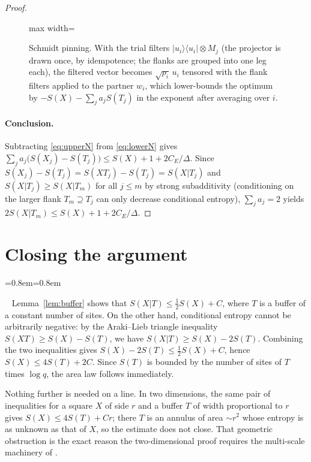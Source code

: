 \documentclass[aps,prx,reprint,superscriptaddress,floatfix,nofootinbib,longbibliography,amsmath,amssymb]{revtex4-2}
\theoremstyle{plain}
\theoremstyle{definition}
\newenvironment{inwords}{%
  \par\medskip\noindent
  \begin{list}{}{\leftmargin=0.8em\rightmargin=0.8em}
  \item\relax
  \noindent{\sffamily\bfseries\color{blue!40!black}In words.}\ \sffamily\small}{%
  \end{list}\par\medskip}
\begin{document}
\begin{proof}
\begin{figure}[t]
\centering
\begin{adjustbox}{max width=\linewidth}

\end{adjustbox}
\caption{Schmidt pinning. With the trial filters $|u_i\rangle\langle u_i|\otimes M_j$ (the projector is drawn once, by idempotence; the flanks are grouped into one leg each), the filtered vector becomes $\sqrt{p_i}\,u_i$ tensored with the flank filters applied to the partner $w_i$, which lower-bounds the optimum by $-S(X)-\sum_ja_jS(T_j)$ in the exponent after averaging over $i$.}\label{fig:pinning}
\end{figure}

\paragraph{Conclusion.}
Subtracting \eqref{eq:upperN} from \eqref{eq:lowerN} gives
$\sum_ja_j\bigl(S(X_j)-S(T_j)\bigr)\le S(X)+1+2C_E/\Delta$. Since
$S(X_j)-S(T_j)=S(XT_j)-S(T_j)=S(X|T_j)$ and $S(X|T_j)\ge S(X|T_m)$ for all
$j\le m$ by strong subadditivity (conditioning on the larger flank
$T_m\supseteq T_j$ can only decrease conditional entropy), $\sum_ja_j=2$
yields $2S(X|T_m)\le S(X)+1+2C_E/\Delta$.
\end{proof}

\section{Closing the argument}\label{sec:closing}

\begin{inwords}
Lemma~\ref{lem:buffer} shows that $S(X|T)\le\frac12S(X)+C$, where $T$ is a
buffer of a constant number of sites. On the other hand, conditional
entropy cannot be arbitrarily negative: by the Araki--Lieb triangle
inequality $S(XT)\ge S(X)-S(T)$, we have $S(X|T)\ge S(X)-2S(T)$. Combining
the two inequalities gives $S(X)-2S(T)\le\frac12S(X)+C$, hence
$S(X)\le 4S(T)+2C$. Since $S(T)$ is bounded by the number of sites of $T$
times $\log q$, the area law follows immediately.

Nothing further is needed on a line. In two dimensions, the same pair of
inequalities for a square $X$ of side $r$ and a buffer $T$ of width
proportional to $r$ gives $S(X)\le 4S(T)+Cr$; there $T$ is an annulus of
area $\sim r^2$ whose entropy is as unknown as that of $X$, so the
estimate does not close. That geometric obstruction is the exact reason
the two-dimensional proof requires the multi-scale machinery of \cite{AL}.
\end{inwords}
\end{document}
